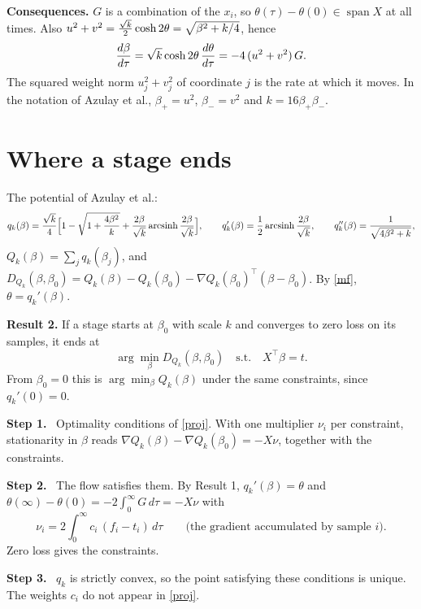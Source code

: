 \documentclass[10pt]{article}
\newcommand{\step}[1]{\par\smallskip\textbf{Step #1.}\ }
\begin{document}
\textbf{Consequences.} $G$ is a combination of the $x_i$, so $\theta(\tau)-\theta(0)\in\operatorname{span}X$ at all times. Also $u^2+v^2=\frac{\sqrt k}2\cosh2\theta=\sqrt{\beta^2+k/4}$, hence
\begin{equation}\label{metric}
\frac{d\beta}{d\tau}=\sqrt k\cosh2\theta\,\frac{d\theta}{d\tau}=-4\,(u^2+v^2)\,G .
\end{equation}
The squared weight norm $u_j^2+v_j^2$ of coordinate $j$ is the rate at which it moves. In the notation of Azulay et al., $\beta_+=u^2$, $\beta_-=v^2$ and $k=16\beta_+\beta_-$.

\section{Where a stage ends}\label{sec:ends}
The potential of Azulay et al.:
\[
q_k(\beta)=\frac{\sqrt k}4\Big[1-\sqrt{1+\frac{4\beta^2}k}+\frac{2\beta}{\sqrt k}\operatorname{arcsinh}\frac{2\beta}{\sqrt k}\Big],\qquad q_k'(\beta)=\frac12\operatorname{arcsinh}\frac{2\beta}{\sqrt k},\qquad q_k''(\beta)=\frac1{\sqrt{4\beta^2+k}} ,
\]
$Q_k(\beta)=\sum_jq_k(\beta_j)$, and $D_{Q_k}(\beta,\beta_0)=Q_k(\beta)-Q_k(\beta_0)-\nabla Q_k(\beta_0)^\top(\beta-\beta_0)$. By \eqref{mf}, $\theta=q_k'(\beta)$. 

\textbf{Result 2.} If a stage starts at $\beta_0$ with scale $k$ and converges to zero loss on its samples, it ends at
\begin{equation}\label{proj}
\arg\min_\beta D_{Q_k}(\beta,\beta_0)\quad\text{s.t.}\quad X^\top\beta=t .
\end{equation}
From $\beta_0=0$ this is $\arg\min_\beta Q_k(\beta)$ under the same constraints, since $q_k'(0)=0$.
\step1 Optimality conditions of \eqref{proj}. With one multiplier $\nu_i$ per constraint, stationarity in $\beta$ reads $\nabla Q_k(\beta)-\nabla Q_k(\beta_0)=-X\nu$, together with the constraints.
\step2 The flow satisfies them. By Result 1, $q_k'(\beta)=\theta$ and $\theta(\infty)-\theta(0)=-2\int_0^\infty G\,d\tau=-X\nu$ with
\[
\nu_i=2\int_0^\infty c_i\,(f_i-t_i)\,d\tau\qquad\text{(the gradient accumulated by sample $i$).}
\]
Zero loss gives the constraints.
\step3 $q_k$ is strictly convex, so the point satisfying these conditions is unique. The weights $c_i$ do not appear in \eqref{proj}.
\end{document}
